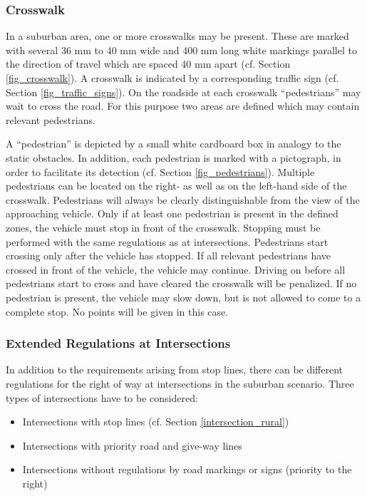 \subsubsection{Crosswalk}

In a suburban area, one or more crosswalks may be present. These are marked
with several 36 mm to 40 mm wide and 400 mm long white markings parallel to the
direction of travel which are spaced 40 mm apart (cf. Section
\ref{fig_crosswalk}). A crosswalk is indicated by a corresponding traffic sign
(cf. Section \ref{fig_traffic_signs}). On the roadside at each crosswalk
“pedestrians” may wait to cross the road. For this purpose two areas are
defined which may contain relevant pedestrians.

A “pedestrian” is depicted by a small white cardboard box in analogy to the
static obstacles. In addition, each pedestrian is marked with a pictograph, in
order to facilitate its detection (cf. Section \ref{fig_pedestrians}). Multiple
pedestrians can be located on the right- as well as on the left-hand side of
the crosswalk. Pedestrians will always be clearly distinguishable from the view
of the approaching vehicle. Only if at least one pedestrian is present in the
defined zones, the vehicle must stop in front of the crosswalk. Stopping must
be performed with the same regulations as at intersections. Pedestrians start
crossing only after the vehicle has stopped. If all relevant pedestrians have
crossed in front of the vehicle, the vehicle may continue. Driving on before
all pedestrians start to cross and have cleared the crosswalk will be
penalized. If no pedestrian is present, the vehicle may slow down, but is not
allowed to come to a complete stop. No points will be given in this case.

\subsubsection{Extended Regulations at Intersections}

In addition to the requirements arising from stop lines, there can be different
regulations for the right of way at intersections in the suburban scenario.
Three types of intersections have to be considered:

\begin{itemize}
	\item Intersections with stop lines (cf. Section \ref{intersection_rural})
	\item Intersections with priority road and give-way lines
	\item Intersections without regulations by road markings or signs (priority to the
	      right)
\end{itemize}

